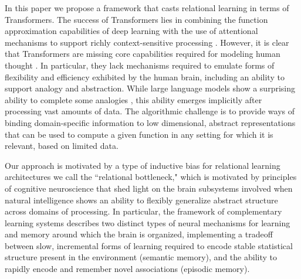 In this paper we propose a framework that casts relational learning in terms of Transformers. 
The success of Transformers lies in combining the function approximation capabilities of deep learning with the use
of attentional mechanisms to support richly context-sensitive processing \citep{transformers,vaswani2017attention,
    kerg2020untangling}. However, it is clear that Transformers are missing core capabilities required for modeling
human thought \citep{mahowald2023dissociating}.  In particular, they lack mechanisms required to emulate forms of
flexibility and efficiency exhibited by the human brain, including an ability to support analogy and abstraction.
While large language models show a surprising ability to complete some analogies \citep{webb}, this ability
emerges implicitly after processing vast amounts of data. The algorithmic challenge is to provide ways of binding
domain-specific information to low dimensional, abstract representations that can be used to compute a given function
in any setting for which it is relevant, based on limited data.

Our approach is motivated by a type of inductive bias for relational learning architectures we call the
``relational bottleneck," which is motivated by principles of cognitive neuroscience that shed light on the brain
subsystems involved when natural intelligence shows an ability to flexibly generalize abstract structure across
domains of processing. In particular, the framework of complementary learning systems \citep{McClelland:1995,
    Kumaran:2016} describes two distinct types of neural mechanisms for learning and memory around which the brain
is organized, implementing a tradeoff between slow, incremental forms of learning required to encode stable statistical
structure present in the environment (semantic memory), and the ability to rapidly encode and remember novel
associations (episodic memory).

